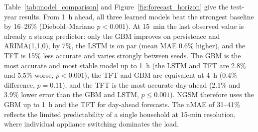 \documentclass[fleqn,10pt]{wlscirep}
\begin{document}
Table~\ref{tab:model_comparison} and Figure~\ref{fig:forecast_horizon} give the test-year results. From 1~h ahead, all three learned models beat the strongest baseline by 16--26\% (Diebold--Mariano $p<0.001$). At 15~min the last observed value is already a strong predictor: only the GBM improves on persistence and ARIMA(1,1,0), by 7\%, the LSTM is on par (mean MAE 0.6\% higher), and the TFT is 15\% less accurate and varies strongly between seeds. The GBM is the most accurate and most stable model up to 1~h (the LSTM and TFT are 2.8\% and 5.5\% worse, $p<0.001$), the TFT and GBM are equivalent at 4~h (0.4\% difference, $p=0.11$), and the TFT is the most accurate day-ahead (2.1\% and 3.9\% lower error than the GBM and LSTM, $p\le0.001$). NGSM therefore uses the GBM up to 1~h and the TFT for day-ahead forecasts. The nMAE of 31--41\% reflects the limited predictability of a single household at 15-min resolution, where individual appliance switching dominates the load.
\end{document}
